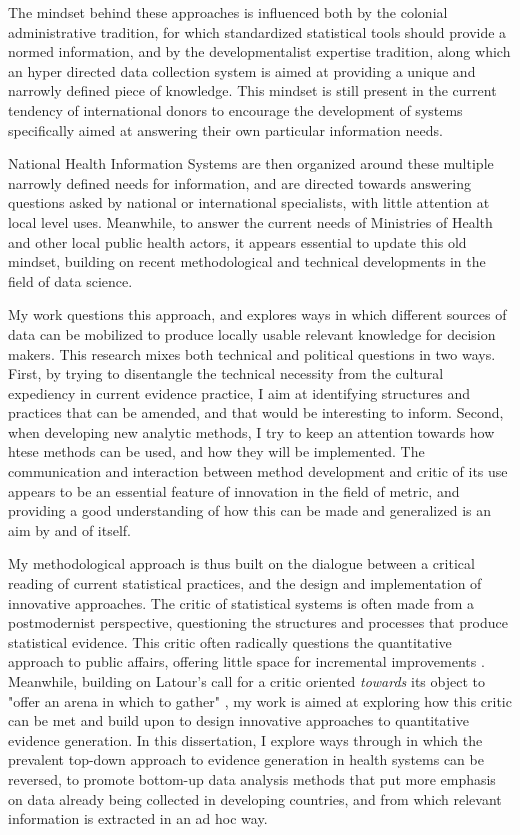 The mindset behind these approaches is influenced both by the colonial administrative tradition, for which standardized statistical tools should provide a normed information, and by the developmentalist expertise tradition, along which an hyper directed data collection system is aimed at providing a unique and narrowly defined piece of knowledge. This mindset is still present in the current tendency of international donors to encourage the development of systems specifically aimed at answering their own particular information needs.

National Health Information Systems are then organized around these multiple narrowly defined needs for information, and are directed towards answering questions asked by national or international specialists, with little attention at local level uses. Meanwhile, to answer the current needs of Ministries of Health and other local public health actors, it appears essential to update this old mindset, building on recent methodological and technical developments in the field of data science.

My work questions this approach, and explores ways in which different sources of data can be mobilized to produce locally usable relevant knowledge for decision makers. This research mixes both technical and political questions in two ways. First, by trying to disentangle the technical necessity from the cultural expediency in current evidence practice, I aim at identifying structures and practices that can be amended, and that would be interesting to inform. Second, when developing new analytic methods, I try to keep an attention towards how htese methods can be used, and how they will be implemented. The communication and interaction between method development and critic of its use appears to be an essential feature of innovation in the field of metric, and providing a good understanding of how this can be made and generalized is an aim by and of itself.

My methodological approach is thus built on the dialogue between a critical reading of current statistical practices, and the design and implementation of innovative approaches. The critic of statistical systems is often made from a postmodernist perspective, questioning the structures and processes that produce statistical evidence. This critic  often radically questions the quantitative approach to public affairs, offering little space for incremental improvements \citep{rottenburg_world_2016}. Meanwhile, building on Latour's call for a critic oriented \textit{towards} its object to "offer an arena in which to gather" \citep{latour_why_2004}, my work is aimed at exploring how this critic can be met and build upon to design innovative approaches to quantitative evidence generation. In this dissertation, I explore ways through in which the prevalent top-down approach to evidence generation in health systems can be reversed, to promote bottom-up data analysis methods that put more emphasis on data already being collected in developing countries, and from which relevant information is extracted in an ad hoc way.

